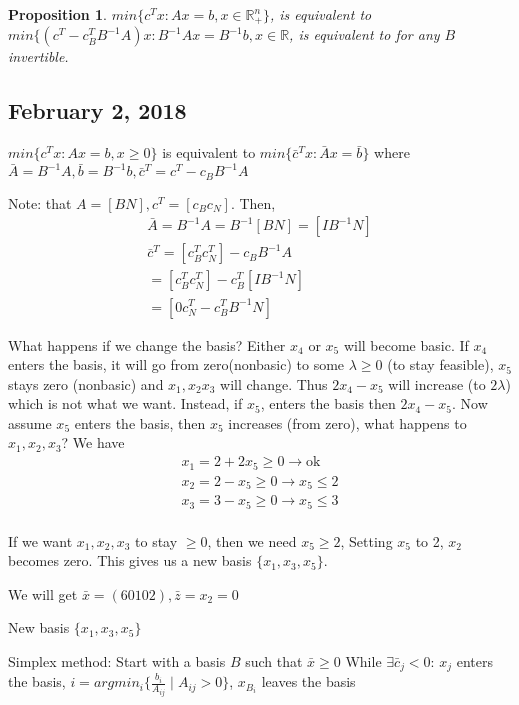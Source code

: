 \documentclass{article}
\theoremstyle{plain}
\newtheorem{prop}{Proposition}
\theoremstyle{definition}
\begin{document}
\begin{prop}
    $min\{c^Tx: Ax = b, x\in\mathbb{R}^n_+\}$, is equivalent to
    $min\{(c^T - c_B^TB^{-1}A )x: B^{-1} Ax = B^{-1}b, x \in\mathbb{R}$, is equivalent to
    for any $B$ invertible.
\end{prop}

\subsection{February 2, 2018}
$min \{c^Tx: Ax = b, x\geq 0\}$ is equivalent to
$min \{\bar{c}^Tx: \bar{A}x=\bar{b}\}$ where
$\bar{A} = B^{-1}A, \bar{b} = B^{-1}b, \bar{c}^T = c^T-c_BB^{-1}A$

Note: that $A = [B N], c^T = [c_B c_N]$. Then,
\begin{align*}
    \bar{A} = B^{-1}A = B^{-1}[B N] = [I B^{-1}N]\\
    \bar{c}^T = [c_B^T c_N^T] - c_BB^{-1}A\\
    = [c_B^T c_N^T] - c_B^T[I B^{-1}N]\\
    = [0 c^T_N - c_B^TB^{-1}N]
\end{align*}

What happens if we change the basis?
Either $x_4$ or $x_5$ will become basic.
If $x_4$ enters the basis, it will go from zero(nonbasic) to
some $\lambda \geq 0$ (to stay feasible), $x_5$ stays zero (nonbasic)
and $x_1, x_2 x_3$ will change. Thus $2x_4 - x_5$ will increase
(to $2\lambda$) which is not what we want. Instead, if $x_5$, enters
the basis then $2x_4 - x_5$. Now assume $x_5$ enters the basis, then
$x_5$ increases (from zero), what happens to $x_1, x_2, x_3$? We
have
\begin{align*}
    x_1 = 2 + 2x_5 \geq 0 \rightarrow \text{ok}\\
    x_2 = 2 - x_5 \geq 0 \rightarrow x_5 \leq 2\\
    x_3 = 3 - x_5 \geq 0 \rightarrow x_5 \leq 3\\
\end{align*}

If we want $x_1, x_2, x_3$ to stay $\geq 0$, then we need
$x_5\geq 2$, Setting $x_5$ to 2, $x_2$ becomes zero.
This gives us a new basis $\{x_1, x_3, x_5\}$.

We will get $\bar{x} = (6 0 1 0 2), \bar{z} = x_2 = 0$

New basis $\{x_1, x_3, x_5\}$

Simplex method:
Start with a basis $B$ such that $\bar{x}\geq 0$ While
$\exists \bar{c}_j < 0$: $x_j$ enters the basis,
$i = argmin_i \{\frac{b_i}{A_{ij}} \mid A_{ij} > 0 \}$,
$x_{B_i}$ leaves the basis
\end{document}
